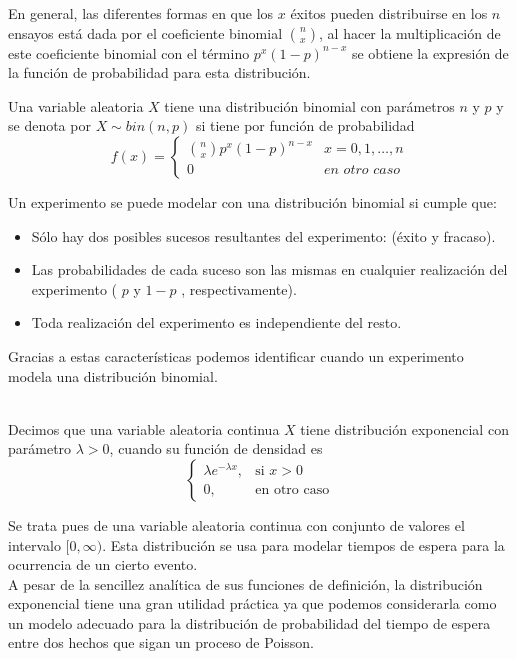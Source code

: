 En general, las diferentes formas en que los $x$ éxitos pueden distribuirse en los $n$ ensayos está dada por el coeficiente binomial $n\choose x$, al hacer la multiplicación de este coeficiente binomial con el término $p^x(1-p)^{n-x}$ se obtiene la expresión de la función de probabilidad para esta distribución.
\begin{Def}
    Una variable aleatoria $X$ tiene una distribución binomial con parámetros $n$ y $p$ y se denota por $X\sim bin(n,p)$ si tiene por función de probabilidad
    $$f(x)=
    \begin{cases}
        {n \choose x} p^x(1-p)^{n-x}& x=0,1,\ldots,n\\0 & \textit{en otro caso}
    \end{cases}$$
\end{Def}
Un experimento se puede modelar con una distribución binomial si cumple que:
\begin{itemize}
    \item Sólo hay dos posibles sucesos resultantes del experimento:
    (éxito y fracaso).
    \item Las probabilidades de cada suceso son las mismas en cualquier realización del experimento ( $p$ y $1-p$ , respectivamente).
    \item Toda realización del experimento es independiente del resto.
\end{itemize}
Gracias a estas características podemos identificar cuando un experimento modela una distribución binomial.\\\\
\begin{Def}
    Decimos que una variable aleatoria continua $X$ tiene distribución exponencial con parámetro $\lambda>0$, cuando su función de densidad es
    $$\begin{cases}
        \lambda e^{-\lambda x}, & \mbox{si $x>0$}\\
        0, & \mbox{en otro caso}
    \end{cases}
    $$
\end{Def}
Se trata pues de una variable aleatoria continua con conjunto de valores el intervalo $[0,\infty)$. Esta distribución se usa para modelar tiempos de espera para la ocurrencia de un cierto evento.\\
A pesar de la sencillez analítica de sus funciones de definición, la distribución exponencial tiene una gran utilidad práctica ya que podemos considerarla como un modelo adecuado para la distribución de probabilidad del tiempo de espera entre dos hechos que sigan un proceso de Poisson.\\
